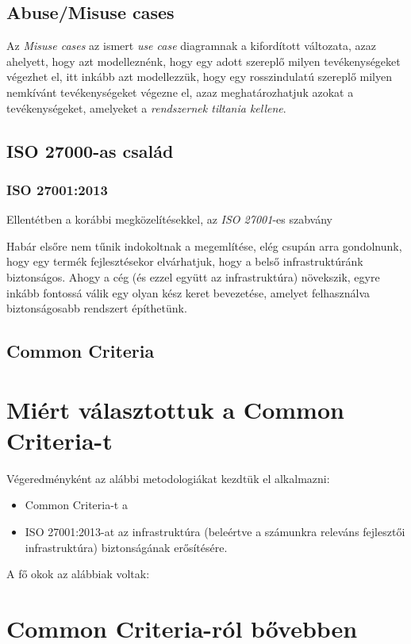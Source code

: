 \subsection{Abuse/Misuse cases}

Az \emph{Misuse cases} az ismert \emph{use case} diagramnak a kifordított változata, azaz ahelyett,
hogy azt modelleznénk, hogy egy adott szereplő milyen tevékenységeket végezhet el, itt inkább azt
modellezzük, hogy egy rosszindulatú szereplő milyen nemkívánt tevékenységeket végezne el, azaz
meghatározhatjuk azokat a tevékenységeket, amelyeket a \emph{rendszernek tiltania kellene}.

\subsection{ISO 27000-as család}
\subsubsection{ISO 27001:2013}
Ellentétben a korábbi megközelítésekkel, az \emph{ISO 27001}-es szabvány 

Habár elsőre nem tűnik indokoltnak a megemlítése, elég csupán arra gondolnunk, hogy
egy termék fejlesztésekor elvárhatjuk, hogy a belső infrastruktúránk biztonságos.
Ahogy a cég (és ezzel együtt az infrastruktúra) növekszik, egyre inkább fontossá
válik egy olyan kész keret bevezetése, amelyet felhasználva biztonságosabb rendszert építhetünk.

\subsection{Common Criteria}

\section{Miért választottuk a Common Criteria-t}

Végeredményként az alábbi metodologiákat kezdtük el alkalmazni:
\begin{itemize}
\item Common Criteria-t a 
\item{ISO 27001:2013-at az infrastruktúra (beleértve a számunkra releváns fejlesztői infrastruktúra)
    biztonságának erősítésére.}
\end{itemize}

A fő okok az alábbiak voltak:



\section{Common Criteria-ról bővebben}

